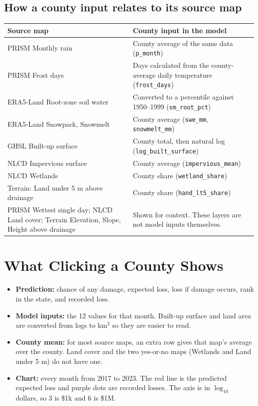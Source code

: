 \documentclass[11pt]{article}
\newcommand{\col}[1]{\texttt{#1}}
\begin{document}
\subsection*{How a county input relates to its source map}

\begin{table}[H]
\centering
\small
\begin{tabularx}{\textwidth}{YY}
\toprule
\textbf{Source map} & \textbf{County input in the model} \\
\midrule
PRISM Monthly rain & County average of the same data (\col{p\_month}) \\
PRISM Frost days & Days calculated from the county-average daily temperature (\col{frost\_days}) \\
ERA5-Land Root-zone soil water & Converted to a percentile against 1950--1999 (\col{sm\_root\_pct}) \\
ERA5-Land Snowpack, Snowmelt & County average (\col{swe\_mm}, \col{snowmelt\_mm}) \\
GHSL Built-up surface & County total, then natural log (\col{log\_built\_surface}) \\
NLCD Impervious surface & County average (\col{impervious\_mean}) \\
NLCD Wetlands & County share (\col{wetland\_share}) \\
Terrain: Land under 5 m above drainage & County share (\col{hand\_lt5\_share}) \\
\midrule
PRISM Wettest single day; NLCD Land cover; Terrain Elevation, Slope, Height above drainage &
Shown for context. These layers are not model inputs themselves. \\
\bottomrule
\end{tabularx}
\end{table}

\section{What Clicking a County Shows}

\begin{itemize}
  \item \textbf{Prediction:} chance of any damage, expected loss, loss if damage occurs, rank in
        the state, and recorded loss.
  \item \textbf{Model inputs:} the 12 values for that month. Built-up surface and land area are
        converted from logs to km$^2$ so they are easier to read.
  \item \textbf{County mean:} for most source maps, an extra row gives that map's average over the
        county. Land cover and the two yes-or-no maps (Wetlands and Land under 5 m) do not have one.
  \item \textbf{Chart:} every month from 2017 to 2023. The red line is the predicted expected loss
        and purple dots are recorded losses. The axis is in $\log_{10}$ dollars, so 3 is \$1k and
        6 is \$1M.
\end{itemize}
\end{document}

